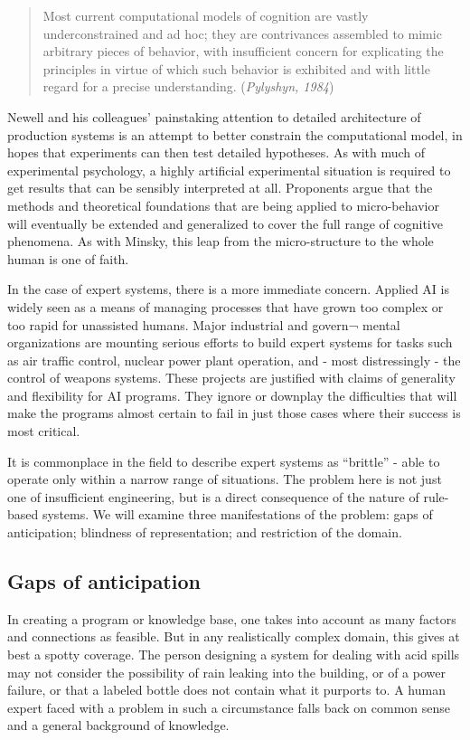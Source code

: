 \documentclass[12pt]{article}
\def\bq{\begin{quote}}
\def\eq{\end{quote}}
\begin{document}
\bq
Most current computational models of cognition are vastly underconstrained and ad hoc; they are contrivances assembled to mimic
arbitrary pieces of behavior, with insufficient concern for explicating the principles in virtue of which such behavior is exhibited and with little regard for a precise understanding. ({\it Pylyshyn, 1984})
\eq

Newell and his colleagues’ painstaking attention to detailed architecture of production systems is an attempt to better constrain the computational model, in hopes that experiments can then test detailed hypotheses. As with much of experimental psychology, a highly artificial experimental situation is required to get results that can be sensibly interpreted at all. Proponents argue that the methods and theoretical foundations that are being applied to micro-behavior will eventually be extended and generalized to cover the full range of cognitive phenomena. As with Minsky, this leap from the micro-structure to the whole human is one of faith.

In the case of expert systems, there is a more immediate concern. Applied AI is widely seen as a means of managing processes that have grown too complex or too rapid for unassisted humans. Major industrial and govern¬ mental organizations are mounting serious efforts to build expert systems for tasks such as air traffic control, nuclear power plant operation, and - most distressingly - the control of weapons systems. These projects are justified with claims of generality and flexibility for AI programs. They ignore or downplay the difficulties that will make the programs almost certain to fail in just those cases where their success is most critical.

It is commonplace in the field to describe expert systems as ``brittle'' - able to operate only within a narrow range of situations. The problem here is not just one of insufficient engineering, but is a direct consequence of the nature of rule-based systems. We will examine three manifestations of the problem: gaps of anticipation; blindness of representation; and restriction of the domain.

\subsection{Gaps of anticipation}

In creating a program or knowledge base, one takes into account as many factors and connections as feasible. But in any realistically complex domain, this gives at best a spotty coverage. The person designing a system for dealing with acid spills may not consider the possibility of rain leaking into the building, or of a power failure, or that a labeled bottle does not contain what it purports to. A human expert faced with a problem in such a circumstance falls back on common sense and a general background of knowledge.
\end{document}
